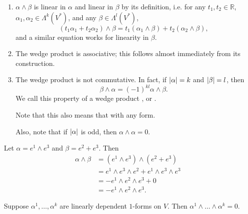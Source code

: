 \documentclass[notoc,notitlepage]{tufte-book}
\begin{document}
\begin{remark}
  \begin{enumerate}
    \item $\alpha \wedge \beta$ is linear in $\alpha$ and linear in $\beta$ by its
      definition, i.e. for any $t_1, t_2 \in \mathbb{R}$,
      $\alpha_1, \alpha_2 \in \Lambda^k(V^*)$, and any $\beta \in \Lambda^l(V^*)$,
      \begin{equation*}
        (t_1 \alpha_1 + t_2 \alpha_2) \wedge \beta
        = t_1(\alpha_1 \wedge \beta) + t_2(\alpha_2 \wedge \beta),
      \end{equation*}
      and a similar equation works for linearity in $\beta$.
    \item The wedge product is associative; this follows almost immediately from
      its construction.
    \item The wedge product is not commutative. In fact, if $\left|\alpha\right| = k$ and
      $\left|\beta\right| = l$, then
      \begin{equation}\label{eq:wedge_product_is_not_commutative}
        \beta \wedge \alpha = \left( -1 \right)^{kl} \alpha \wedge \beta.
      \end{equation}
      We call this property of a wedge product ,
       or .

      Note that this also means that  with any
      form.

      Also, note that if $\left|\alpha\right|$ is odd, then $\alpha \wedge \alpha = 0$.
  \end{enumerate}
\end{remark}

\begin{eg}
  Let $\alpha = e^1 \wedge e^3$ and $\beta = e^2 + e^3$. Then
  \begin{align*}
    \alpha \wedge \beta &= \left( e^1 \wedge e^3 \right) \wedge \left( e^2 + e^3 \right) \\
                        &= e^1 \wedge e^3 \wedge e^2 + e^1 \wedge e^3 \wedge e^3 \\
                        &= - e^1 \wedge e^2 \wedge e^3 + 0 \\
                        &= - e^1 \wedge e^2 \wedge e^3.
  \end{align*}
\end{eg}

\begin{eg}
  Suppose $\alpha^1, \ldots, \alpha^k$ are linearly dependent $1$-forms on $V$.
  Then $\alpha^1 \wedge \hdots \wedge \alpha^k = 0$.
\end{eg}
\end{document}
